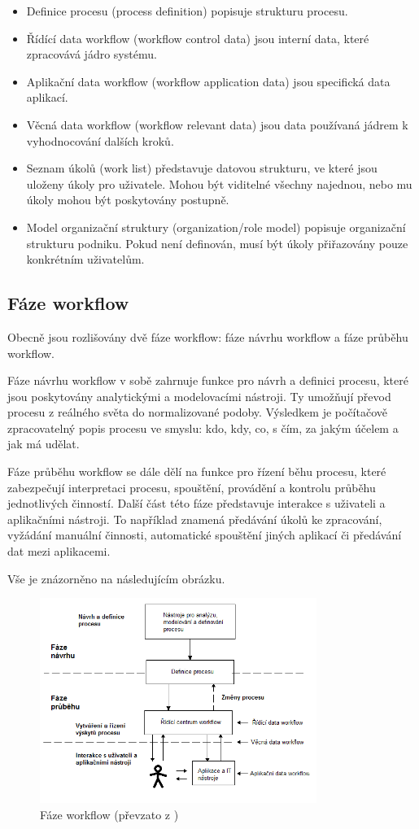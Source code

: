 \documentclass{fithesis}
\begin{document}
\begin{itemize}
\item Definice procesu (process definition) popisuje strukturu procesu.
\item Řídící data workflow (workflow control data) jsou interní data, které zpracovává jádro systému.
\item Aplikační data workflow (workflow application data) jsou specifická data aplikací.
\item Věcná data workflow (workflow relevant data) jsou data používaná jádrem k vyhodnocování dalších kroků.
\item Seznam úkolů (work list) představuje datovou strukturu, ve které jsou uloženy úkoly pro uživatele. Mohou být viditelné všechny najednou, nebo mu úkoly mohou být poskytovány postupně.
\item Model organizační struktury (organization/role model) popisuje organizační strukturu podniku. Pokud není definován, musí být úkoly přiřazovány pouze konkrétním uživatelům.
\end{itemize}

\subsection{Fáze workflow}
Obecně jsou rozlišovány dvě fáze workflow: fáze návrhu workflow a fáze průběhu workflow. \cite{workflow}

Fáze návrhu workflow v sobě zahrnuje funkce pro návrh a definici procesu, které jsou poskytovány analytickými a modelovacími nástroji. Ty umožňují převod procesu z reálného světa do normalizované podoby. Výsledkem je počítačově zpracovatelný popis procesu ve smyslu: kdo, kdy, co, s čím, za jakým účelem a jak má udělat.

Fáze průběhu workflow se dále dělí na funkce pro řízení běhu procesu, které zabezpečují interpretaci procesu, spouštění, provádění a kontrolu průběhu jednotlivých činností. Další část této fáze představuje interakce s uživateli a aplikačními nástroji. To například znamená předávání úkolů ke zpracování, vyžádání manuální činnosti, automatické spouštění jiných aplikací či předávání dat mezi aplikacemi.

Vše je znázorněno na následujícím obrázku.

\begin{figure}[htp]
\centering
\includegraphics[width=340px]{images/faze_workflow.png}
\caption{Fáze workflow (převzato z \cite{wfmc})}
\end{figure}
\end{document}
